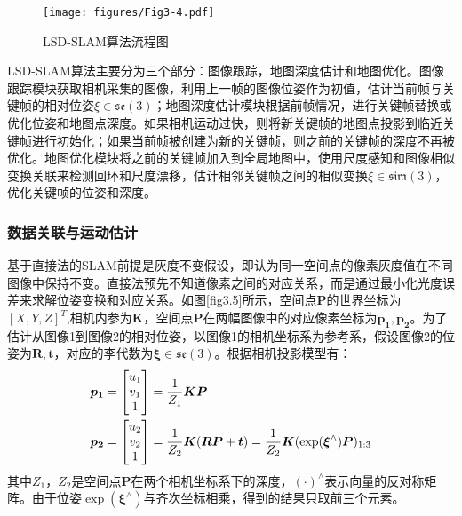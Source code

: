 \begin{figure}[h]
\centering
\texttt{[image: figures/Fig3-4.pdf]}
\caption{LSD-SLAM算法流程图}
\label{fig3.4}
\end{figure}

LSD-SLAM算法主要分为三个部分：图像跟踪，地图深度估计和地图优化。图像跟踪模块获取相机采集的图像，利用上一帧的图像位姿作为初值，估计当前帧与关键帧的相对位姿$\xi \in \mathfrak{se}(3) $；地图深度估计模块根据前帧情况，进行关键帧替换或优化位姿和地图点深度。如果相机运动过快，则将新关键帧的地图点投影到临近关键帧进行初始化；如果当前帧被创建为新的关键帧，则之前的关键帧的深度不再被优化。地图优化模块将之前的关键帧加入到全局地图中，使用尺度感知和图像相似变换关联来检测回环和尺度漂移，估计相邻关键帧之间的相似变换$\xi \in \mathfrak{sim}(3)$，优化关键帧的位姿和深度。

\subsubsection{数据关联与运动估计}
基于直接法的SLAM前提是灰度不变假设，即认为同一空间点的像素灰度值在不同图像中保持不变。直接法预先不知道像素之间的对应关系，而是通过最小化光度误差来求解位姿变换和对应关系。如图\ref{fig3.5}所示，空间点$\boldsymbol{P}$的世界坐标为$[X,Y,Z]^T$,相机内参为$\boldsymbol{K}$，空间点$\boldsymbol{P}$在两幅图像中的对应像素坐标为$\boldsymbol{p_1},\boldsymbol{p_2}$。为了估计从图像1到图像2的相对位姿，以图像1的相机坐标系为参考系，假设图像2的位姿为$\boldsymbol{R},\boldsymbol{t}$，对应的李代数为$\boldsymbol{\xi} \in \mathfrak{se}(3) $。根据相机投影模型有：
\begin{equation}
\label{equ3.8}
\begin{aligned}
& \boldsymbol{p_1} = 
\begin{bmatrix}
u_1 \cr v_1 \cr 1 \cr 
\end{bmatrix}
={1 \over Z_1} \boldsymbol{K} \boldsymbol{P}
\\
& \boldsymbol{p_2} = 
\begin{bmatrix}
u_2 \cr v_2 \cr 1 \cr
\end{bmatrix}
={1 \over Z_2} \boldsymbol{K} ( \boldsymbol{R} \boldsymbol{P}+\boldsymbol{t}) = {1 \over Z_2} \boldsymbol{K} ( \exp (\boldsymbol{\xi}^{\wedge}) \boldsymbol{P})_{1:3}
\end{aligned}
\end{equation}
其中$Z_1$，$Z_2$是空间点$\boldsymbol{P}$在两个相机坐标系下的深度，$(\cdot)^{\wedge}$表示向量的反对称矩阵。由于位姿$\exp(\boldsymbol{\xi}^{\wedge})$与齐次坐标相乘，得到的结果只取前三个元素。

